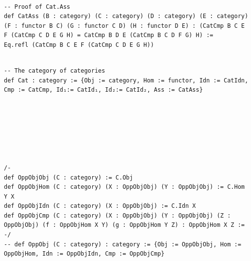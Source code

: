 \documentclass{book}
\newcounter{lcounter}
\newcounter{sectioncount}
\newcounter{subsectioncount}
\renewcommand{\section}[1]{\newpage
\ \\
\ \\
 \begin{center} \scalebox{1.5}{\texttt{\thesectioncount . #1}} \setcounter{sectioncount}{\thesectioncount+1} \setcounter{subsectioncount}{1} \end{center}
 \begin{center}

\ \\
\ \\

\thispagestyle{empty}
\end{center}
}
\begin{document}
\begin{center}
\begin{tcolorbox}[width=5in,colback={white},title={\begin{center}\texttt{Lean \thelcounter} \addtocounter{lcounter}{1}  \end{center}},colbacktitle=Blue,coltitle=black]
\begin{verbatim}

-- Proof of Cat.Ass
def CatAss (B : category) (C : category) (D : category) (E : category) (F : functor B C) (G : functor C D) (H : functor D E) : (CatCmp B C E F (CatCmp C D E G H) = CatCmp B D E (CatCmp B C D F G) H) := 
Eq.refl (CatCmp B C E F (CatCmp C D E G H))

\end{verbatim}%
\end{tcolorbox}
\end{center}


\begin{center}
\begin{tcolorbox}[width=5in,colback={white},title={\begin{center}\texttt{Lean \thelcounter} \addtocounter{lcounter}{1}  \end{center}},colbacktitle=Blue,coltitle=black]
\begin{verbatim}

-- The category of categories
def Cat : category := {Obj := category, Hom := functor, Idn := CatIdn, Cmp := CatCmp, Id₁:= CatId₁, Id₂:= CatId₂, Ass := CatAss}

\end{verbatim}%
\end{tcolorbox}
\end{center}


\section{ᵒᵖ}

\begin{center}
\begin{tcolorbox}[width=5in,colback={white},title={\begin{center}\texttt{Lean \thelcounter} \addtocounter{lcounter}{1}  \end{center}},colbacktitle=Blue,coltitle=black]
\begin{verbatim}

/-
def OppObjObj (C : category) := C.Obj
def OppObjHom (C : category) (X : OppObjObj) (Y : OppObjObj) := C.Hom Y X
def OppObjIdn (C : category) (X : OppObjObj) := C.Idn X
def OppObjCmp (C : category) (X : OppObjObj) (Y : OppObjObj) (Z : OppObjObj) (f : OppObjHom X Y) (g : OppObjHom Y Z) : OppObjHom X Z := 
-/
-- def OppObj (C : category) : category := {Obj := OppObjObj, Hom := OppObjHom, Idn := OppObjIdn, Cmp := OppObjCmp}

\end{verbatim}%
\end{tcolorbox}
\end{center}
\end{document}
